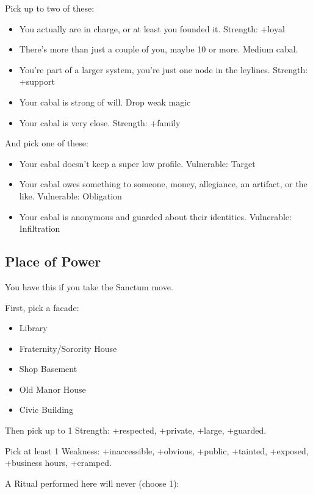 \documentclass[10pt,twoside,openright]{memoir}
\begin{document}
Pick up to two of these:

\begin{itemize}
\tightlist
\item
  You actually are in charge, or at least you founded it. Strength:
  +loyal
\item
  There's more than just a couple of you, maybe 10 or more. Medium
  cabal.
\item
  You're part of a larger system, you're just one node in the leylines.
  Strength: +support
\item
  Your cabal is strong of will. Drop weak magic
\item
  Your cabal is very close. Strength: +family
\end{itemize}

And pick one of these:

\begin{itemize}
\tightlist
\item
  Your cabal doesn't keep a super low profile. Vulnerable: Target
\item
  Your cabal owes something to someone, money, allegiance, an artifact,
  or the like. Vulnerable: Obligation
\item
  Your cabal is anonymous and guarded about their identities.
  Vulnerable: Infiltration
\end{itemize}

\hypertarget{place-of-power}{%
\subsection{Place of Power}\label{place-of-power}}

You have this if you take the Sanctum move.

First, pick a facade:

\begin{itemize}
\tightlist
\item
  Library
\item
  Fraternity/Sorority House
\item
  Shop Basement
\item
  Old Manor House
\item
  Civic Building
\end{itemize}

Then pick up to 1 Strength: +respected, +private, +large, +guarded.

Pick at least 1 Weakness: +inaccessible, +obvious, +public, +tainted,
+exposed, +business hours, +cramped.

A Ritual performed here will never (choose 1):
\end{document}
